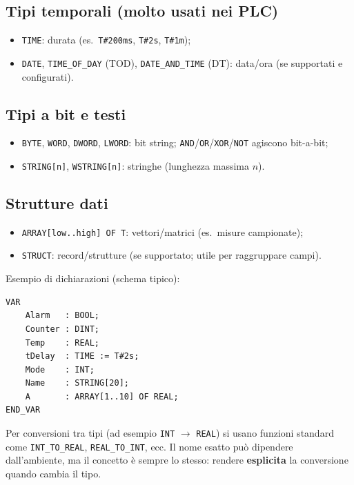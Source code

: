 \subsection{Tipi temporali (molto usati nei PLC)}
\begin{itemize}
    \item \texttt{TIME}: durata (es.\ \texttt{T\#200ms}, \texttt{T\#2s}, \texttt{T\#1m});
    \item \texttt{DATE}, \texttt{TIME\_OF\_DAY} (TOD), \texttt{DATE\_AND\_TIME} (DT): data/ora (se supportati e configurati).
\end{itemize}

\subsection{Tipi a bit e testi}
\begin{itemize}
    \item \texttt{BYTE}, \texttt{WORD}, \texttt{DWORD}, \texttt{LWORD}: bit string; \texttt{AND}/\texttt{OR}/\texttt{XOR}/\texttt{NOT} agiscono bit-a-bit;
    \item \texttt{STRING[n]}, \texttt{WSTRING[n]}: stringhe (lunghezza massima $n$).
\end{itemize}

\subsection{Strutture dati}
\begin{itemize}
    \item \texttt{ARRAY[low..high] OF T}: vettori/matrici (es.\ misure campionate);
    \item \texttt{STRUCT}: record/strutture (se supportato; utile per raggruppare campi).
\end{itemize}

Esempio di dichiarazioni (schema tipico):
\begin{lstlisting}[basicstyle=\ttfamily\small]
VAR
    Alarm   : BOOL;
    Counter : DINT;
    Temp    : REAL;
    tDelay  : TIME := T#2s;
    Mode    : INT;
    Name    : STRING[20];
    A       : ARRAY[1..10] OF REAL;
END_VAR
\end{lstlisting}

\begin{note}
Per conversioni tra tipi (ad esempio \texttt{INT} $\to$ \texttt{REAL}) si usano funzioni standard come \texttt{INT\_TO\_REAL}, \texttt{REAL\_TO\_INT}, ecc. Il nome esatto può dipendere dall'ambiente, ma il concetto è sempre lo stesso: rendere \textbf{esplicita} la conversione quando cambia il tipo.
\end{note}
